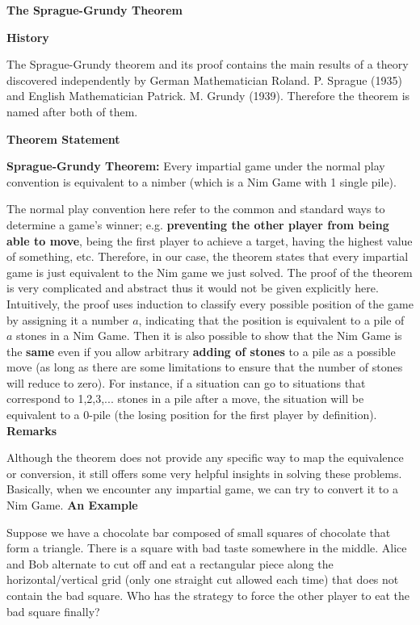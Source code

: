 \noindent
\textbf{The Sprague-Grundy Theorem}

\noindent
	\textbf{History}
	
		The Sprague-Grundy theorem and its proof contains the main results of a theory discovered independently by German Mathematician Roland. P. Sprague (1935) and English Mathematician Patrick. M. Grundy (1939). Therefore the theorem is named after both of them.
		
		\noindent
	\textbf{Theorem Statement}
		\begin{theorem}
			\textbf{Sprague-Grundy Theorem:} Every impartial game under the normal play convention is equivalent to a nimber (which is a Nim Game with 1 single pile).
		\end{theorem}
		The normal play convention here refer to the common and standard ways to determine a game's winner; e.g. \textbf{preventing the other player from being able to move}, being the first player to achieve a target, having the highest value of something, etc. Therefore, in our case, the theorem states that every impartial game is just equivalent to the Nim game we just solved. The proof of the theorem is very complicated and abstract thus it would not be given explicitly here. Intuitively, the proof uses induction to classify every possible position of the game by assigning it a number $a$, indicating that the position is equivalent to a pile of $a$ stones in a Nim Game. Then it is also possible to show that the Nim Game is the \textbf{same} even if you allow arbitrary \textbf{adding of stones} to a pile as a possible move (as long as there are some limitations to ensure that the number of stones will reduce to zero). For instance, if a situation can go to situations that correspond to 1,2,3,... stones in a pile after a move, the situation will be equivalent to a 0-pile (the losing position for the first player by definition). 
		\noindent
	\textbf{Remarks}
	
		 Although the theorem does not provide any specific way to map the equivalence or conversion, it still offers some very helpful insights in solving these problems. Basically, when we encounter any impartial game, we can try to convert it to a Nim Game. 
		 \noindent
	\textbf{An Example}
	
		\begin{problem}
			Suppose we have a chocolate bar composed of small squares of chocolate that form a triangle. There is a square with bad taste somewhere in the middle. Alice and Bob alternate to cut off and eat a rectangular piece along the horizontal/vertical grid (only one straight cut allowed each time) that does not contain the bad square. Who has the strategy to force the other player to eat the bad square finally?
		\end{problem}
	
